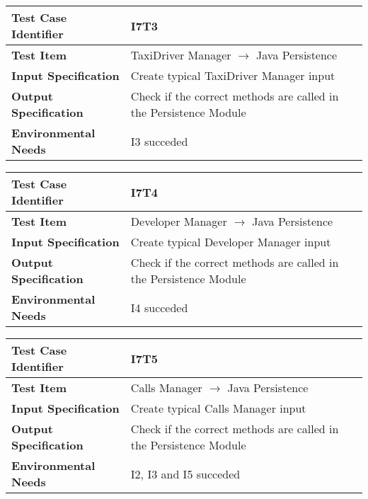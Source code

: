 \begin{table}[!htbp]
\begin{center}
\begin{tabular}[t]{p{}p{}}

\hline
\textbf{Test Case Identifier} & I7T3 \\
\hline
\textbf{Test Item} & TaxiDriver Manager $\rightarrow$ Java Persistence \\
\hline
\textbf{Input Specification} & Create typical TaxiDriver Manager input \\
\hline
\textbf{Output Specification} & Check if the correct methods are called in the Persistence Module \\
\hline
\textbf{Environmental Needs} & I3 succeded \\
\hline

\end{tabular}
\end{center}
\end{table}

\begin{table}[!htbp]
\begin{center}
\begin{tabular}[t]{p{}p{}}

\hline
\textbf{Test Case Identifier} & I7T4 \\
\hline
\textbf{Test Item} & Developer Manager $\rightarrow$ Java Persistence \\
\hline
\textbf{Input Specification} & Create typical Developer Manager input \\
\hline
\textbf{Output Specification} & Check if the correct methods are called in the Persistence Module \\
\hline
\textbf{Environmental Needs} & I4 succeded \\
\hline

\end{tabular}
\end{center}
\end{table}

\begin{table}[!htbp]
\begin{center}
\begin{tabular}[t]{p{}p{}}

\hline
\textbf{Test Case Identifier} & I7T5 \\
\hline
\textbf{Test Item} & Calls Manager $\rightarrow$ Java Persistence \\
\hline
\textbf{Input Specification} & Create typical Calls Manager input \\
\hline
\textbf{Output Specification} & Check if the correct methods are called in the Persistence Module \\
\hline
\textbf{Environmental Needs} & I2, I3 and I5 succeded \\
\hline

\end{tabular}
\end{center}
\end{table}

